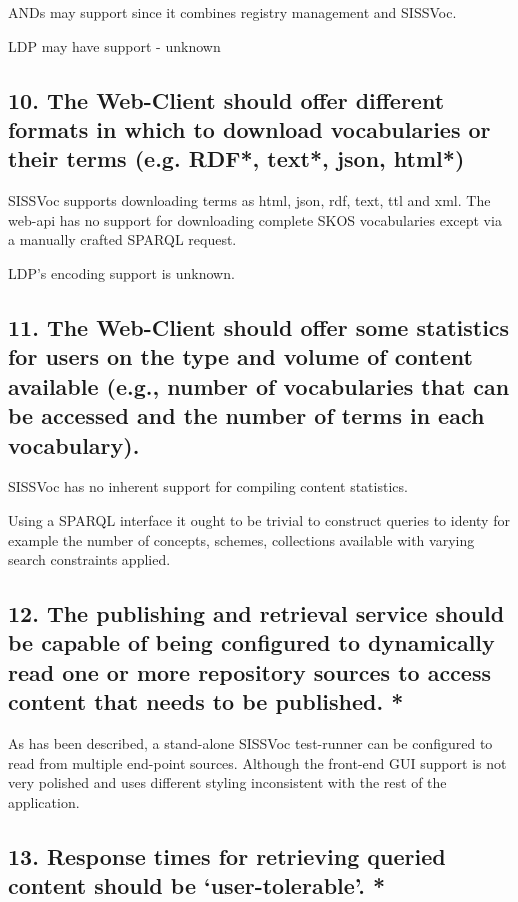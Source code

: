 \documentclass[10pt,a4paper]{article}
\begin{document}
\begin{flushleft}
\item [ANDs] may support since it combines registry management and SISSVoc. 

\item [LDP] may have support - unknown



\subsection{ 10. The Web-Client should offer different formats in which to
download vocabularies or their terms (e.g. RDF*, text*, json, html*) }

SISSVoc supports downloading terms as html, json, rdf, text, ttl and xml. The
web-api has no support for downloading complete SKOS vocabularies except via a
manually crafted SPARQL request.

LDP's encoding support is unknown.

\subsection{ 11. The Web-Client should offer some statistics for users on the
type and volume of content available (e.g., number of vocabularies that can be
accessed and the number of terms in each vocabulary).  }
 

SISSVoc has no inherent support for compiling content statistics.

Using a SPARQL interface it ought to be trivial to construct queries to identy
for example the number of concepts, schemes, collections available with varying
search constraints applied. 

\subsection{ 12. The publishing and retrieval service should be capable of
being configured to dynamically read one or more repository sources to access
content that needs to be published. * }

As has been described, a stand-alone SISSVoc test-runner can be configured to
read from multiple end-point sources. Although the front-end GUI support is not
very polished and uses different styling inconsistent with the rest of the
application.


\subsection{ 
13. Response times for retrieving queried content should be ‘user-tolerable’. *
}


\end{flushleft}
\end{document}
